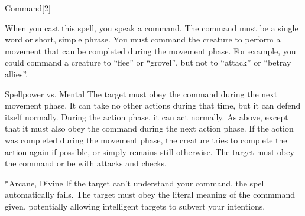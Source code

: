 \begin{spellsection}{Command}[2]
    \begin{spellheader}
    \end{spellheader}
    \begin{spellcontent}
        \begin{spelltargetinginfo}
        \end{spelltargetinginfo}
        \begin{spelleffects}
            \spellspecial When you cast this spell, you speak a command.
            The command must be a single word or short, simple phrase.
            You must command the creature to perform a movement that can be completed during the movement phase.
            For example, you could command a creature to ``flee'' or ``grovel'', but not to ``attack'' or ``betray allies''.
            \begin{spellattack}{Spellpower vs. Mental}
                \spellsuccess The target must obey the command during the next movement phase.
                It can take no other actions during that time, but it can defend itself normally.
                During the action phase, it can act normally.
                \spellcritical As above, except that it must also obey the command during the next action phase.
                If the action was completed during the movement phase, the creature tries to complete the action again if possible, or simply remains still otherwise.
                \spellfailure The target must obey the command or be \impaired with attacks and checks.
            \end{spellattack}
            \spelldur \durbrief
        \end{spelleffects}
    \end{spellcontent}
    \begin{spellfooter}
        *{Arcane, Divine}
        \spellnotes If the target can't understand your command, the spell automatically fails. The target must obey the literal meaning of the commmand given, potentially allowing intelligent targets to subvert your intentions.
        \miscastrandom
    \end{spellfooter}
    \begin{spellaugments}
    \end{spellaugments}
\end{spellsection}

